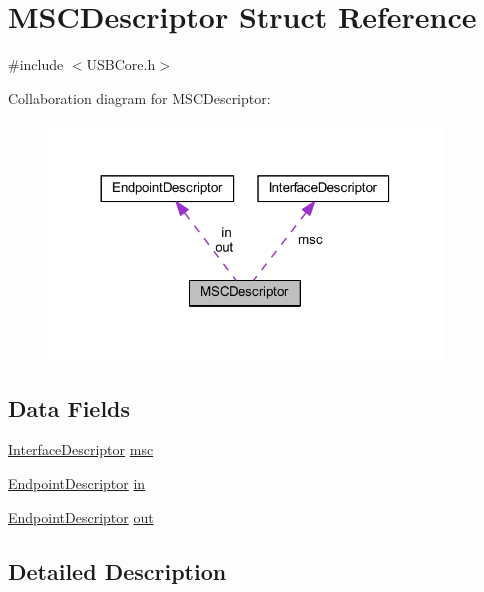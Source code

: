 \hypertarget{struct_m_s_c_descriptor}{}\section{M\+S\+C\+Descriptor Struct Reference}
\label{struct_m_s_c_descriptor}


{\ttfamily \#include $<$U\+S\+B\+Core.\+h$>$}



Collaboration diagram for M\+S\+C\+Descriptor\+:
\nopagebreak
\begin{figure}[H]
\begin{center}
\leavevmode
\includegraphics[width=296pt]{struct_m_s_c_descriptor__coll__graph}
\end{center}
\end{figure}
\subsection*{Data Fields}
\begin{DoxyCompactItemize}
\item 
\hyperlink{struct_interface_descriptor}{Interface\+Descriptor} \hyperlink{struct_m_s_c_descriptor_af01c68cfcf5830b0d5ff44c2751c12c0}{msc}
\item 
\hyperlink{struct_endpoint_descriptor}{Endpoint\+Descriptor} \hyperlink{struct_m_s_c_descriptor_a93dcef3b3e3062b904269bcad94771b5}{in}
\item 
\hyperlink{struct_endpoint_descriptor}{Endpoint\+Descriptor} \hyperlink{struct_m_s_c_descriptor_afcf3c947c6e5ace7853bc3e313c0c4aa}{out}
\end{DoxyCompactItemize}


\subsection{Detailed Description}


